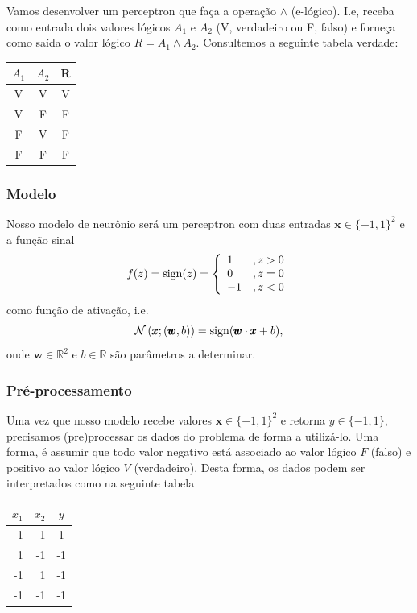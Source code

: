 Vamos desenvolver um perceptron que faça a operação $\land$ (e-lógico). I.e, receba como entrada dois valores lógicos $A_1$ e $A_2$ (V, verdadeiro ou F, falso) e forneça como saída o valor lógico $R = A_1 \land A_2$. Consultemos a seguinte tabela verdade:

\begin{center}
  \begin{tabular}{cc|c}
    $A_1$ & $A_2$ & R\\\hline
    V & V & V\\
    V & F & F\\
    F & V & F\\
    F & F & F\\\hline
  \end{tabular}
\end{center}


\subsubsection{Modelo}

Nosso modelo de neurônio será um perceptron com duas entradas $\pmb{x}\in \{-1,1\}^2$ e a função sinal
\begin{equation}
  f(z) = \operatorname{sign}(z) = \left\{
    \begin{array}{ll}
      1 &, z>0\\
      0 &, z=0\\
      -1 &, z<0
    \end{array}
\right.
\end{equation}
como função de ativação, i.e.
\begin{equation}
  \mathcal{N}\left(\pmb{x};(\pmb{w},b)\right) = \operatorname{sign}(\pmb{w}\cdot\pmb{x} + b),
\end{equation}
onde $\pmb{w}\in\mathbb{R}^2$ e $b\in\mathbb{R}$ são parâmetros a determinar.


\subsubsection{Pré-processamento}

Uma vez que nosso modelo recebe valores $\pmb{x}\in \{-1,1\}^2$ e retorna $y\in\{-1,1\}$, precisamos (pre)processar os dados do problema de forma a utilizá-lo. Uma forma, é assumir que todo valor negativo está associado ao valor lógico $F$ (falso) e positivo ao valor lógico $V$ (verdadeiro). Desta forma, os dados podem ser interpretados como na seguinte tabela

\begin{center}
  \begin{tabular}{rr|c}
    $x_1$ & $x_2$ & $y$\\\hline
    1 & 1 & 1\\
    1 & -1 & -1\\
    -1 & 1 & -1\\
    -1 & -1 & -1\\\hline
  \end{tabular}
\end{center}
    
